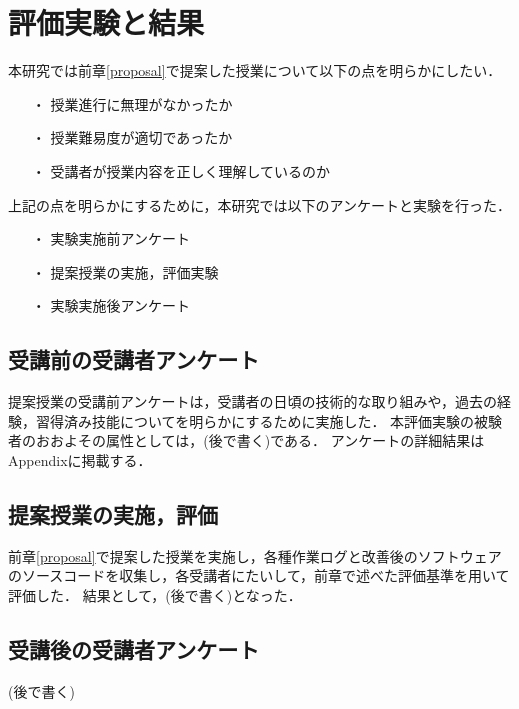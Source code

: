 \chapter{評価実験と結果}

本研究では前章\ref{proposal}で提案した授業について以下の点を明らかにしたい．

\begin{itemize}
  \item[・] 授業進行に無理がなかったか
  \item[・] 授業難易度が適切であったか
  \item[・] 受講者が授業内容を正しく理解しているのか
\end{itemize}

上記の点を明らかにするために，本研究では以下のアンケートと実験を行った．

\begin{itemize}
  \item[・] 実験実施前アンケート
  \item[・] 提案授業の実施，評価実験
  \item[・] 実験実施後アンケート
\end{itemize}

\section{受講前の受講者アンケート}

提案授業の受講前アンケートは，受講者の日頃の技術的な取り組みや，過去の経験，習得済み技能についてを明らかにするために実施した．
本評価実験の被験者のおおよその属性としては，(後で書く)である．
アンケートの詳細結果はAppendixに掲載する．

\section{提案授業の実施，評価}

前章\ref{proposal}で提案した授業を実施し，各種作業ログと改善後のソフトウェアのソースコードを収集し，各受講者にたいして，前章で述べた評価基準を用いて評価した．
結果として，(後で書く)となった．

\section{受講後の受講者アンケート}

(後で書く)
